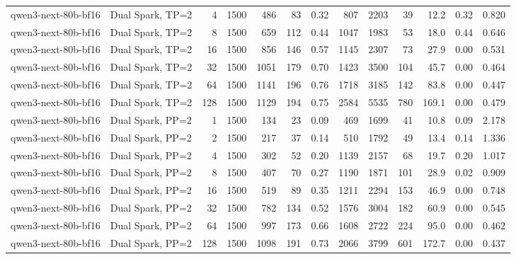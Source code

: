 \begin{tabular}{l l r r r r r r r r r r r}
qwen3-next-80b-bf16 & Dual Spark, TP=2 & 4 & 1500 & 486 & 83 & 0.32 & 807 & 2203 & 39 & 12.2 & 0.32 & 0.820 \\
qwen3-next-80b-bf16 & Dual Spark, TP=2 & 8 & 1500 & 659 & 112 & 0.44 & 1047 & 1983 & 53 & 18.0 & 0.44 & 0.646 \\
qwen3-next-80b-bf16 & Dual Spark, TP=2 & 16 & 1500 & 856 & 146 & 0.57 & 1145 & 2307 & 73 & 27.9 & 0.00 & 0.531 \\
qwen3-next-80b-bf16 & Dual Spark, TP=2 & 32 & 1500 & 1051 & 179 & 0.70 & 1423 & 3500 & 104 & 45.7 & 0.00 & 0.464 \\
qwen3-next-80b-bf16 & Dual Spark, TP=2 & 64 & 1500 & 1141 & 196 & 0.76 & 1718 & 3185 & 142 & 83.8 & 0.00 & 0.447 \\
qwen3-next-80b-bf16 & Dual Spark, TP=2 & 128 & 1500 & 1129 & 194 & 0.75 & 2584 & 5535 & 780 & 169.1 & 0.00 & 0.479 \\
\addlinespace
qwen3-next-80b-bf16 & Dual Spark, PP=2 & 1 & 1500 & 134 & 23 & 0.09 & 469 & 1699 & 41 & 10.8 & 0.09 & 2.178 \\
qwen3-next-80b-bf16 & Dual Spark, PP=2 & 2 & 1500 & 217 & 37 & 0.14 & 510 & 1792 & 49 & 13.4 & 0.14 & 1.336 \\
qwen3-next-80b-bf16 & Dual Spark, PP=2 & 4 & 1500 & 302 & 52 & 0.20 & 1139 & 2157 & 68 & 19.7 & 0.20 & 1.017 \\
qwen3-next-80b-bf16 & Dual Spark, PP=2 & 8 & 1500 & 407 & 70 & 0.27 & 1190 & 1871 & 101 & 28.9 & 0.02 & 0.909 \\
qwen3-next-80b-bf16 & Dual Spark, PP=2 & 16 & 1500 & 519 & 89 & 0.35 & 1211 & 2294 & 153 & 46.9 & 0.00 & 0.748 \\
qwen3-next-80b-bf16 & Dual Spark, PP=2 & 32 & 1500 & 782 & 134 & 0.52 & 1576 & 3004 & 182 & 60.9 & 0.00 & 0.545 \\
qwen3-next-80b-bf16 & Dual Spark, PP=2 & 64 & 1500 & 997 & 173 & 0.66 & 1608 & 2722 & 224 & 95.0 & 0.00 & 0.462 \\
qwen3-next-80b-bf16 & Dual Spark, PP=2 & 128 & 1500 & 1098 & 191 & 0.73 & 2066 & 3799 & 601 & 172.7 & 0.00 & 0.437 \\
\bottomrule
\end{tabular}
